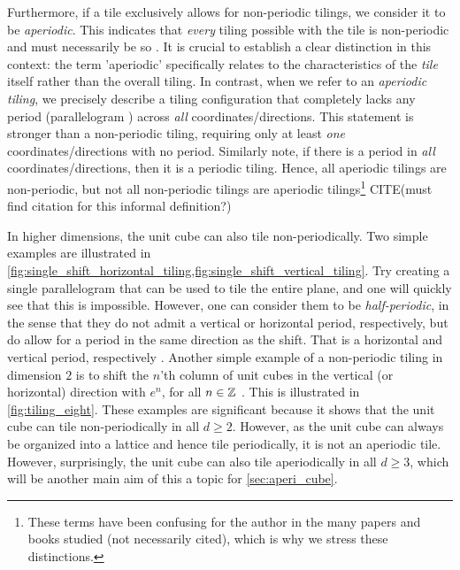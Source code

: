\documentclass[../thesis.tex]{subfiles}
\begin{document}
Furthermore, if a tile exclusively allows for non-periodic tilings, we consider it to be \emph{aperiodic}. This indicates that \emph{every} tiling possible with the tile is non-periodic and must necessarily be so \cite[p. 520]{grunbaumTilingsPatterns1987}. It is crucial to establish a clear distinction in this context: the term 'aperiodic' specifically relates to the characteristics of the \emph{tile} itself rather than the overall tiling. In contrast, when we refer to an \emph{aperiodic tiling}, we precisely describe a tiling configuration that completely lacks any period (parallelogram ) across \emph{all} coordinates/directions. This statement is stronger than a non-periodic tiling, requiring only at least \emph{one} coordinates/directions with no period. Similarly note, if there is a period in \emph{all} coordinates/directions, then it is a periodic tiling. Hence, all aperiodic tilings are non-periodic, but not all non-periodic tilings are aperiodic tilings\footnote[1]{These terms have been confusing for the author in the many papers and books studied (not necessarily cited), which is why we stress these distinctions.} CITE(must find citation for this informal definition?) %

In higher dimensions, the unit cube can also tile non-periodically. Two simple examples are illustrated in \cref{fig:single_shift_horizontal_tiling,fig:single_shift_vertical_tiling}. Try creating a single parallelogram that can be used to tile the entire plane, and one will quickly see that this is impossible. However, one can consider them to be \emph{half-periodic}, in the sense that they do not admit a vertical or horizontal period, respectively, but do allow for a period in the same direction as the shift. That is a horizontal and vertical period, respectively \cite{kolountzakisTilingsTranslation2010}. Another simple example of a non-periodic tiling in dimension $2$ is to shift the $n$'th column of unit cubes in the vertical (or horizontal) direction with $e^n$, for all $n\in\mathbb{Z}$ \cite{liuUniformityNonUniformGabor2003}. This is illustrated in \cref{fig:tiling_eight}. These examples are significant because it shows that the unit cube can tile non-periodically in all $d\geq 2$. However, as the unit cube can always be organized into a lattice and hence tile periodically, it is not an aperiodic tile. However, surprisingly, the unit cube can also tile aperiodically in all $d\geq 3$, which will be another main aim of this  a topic for \cref{sec:aperi_cube}.
\end{document}
